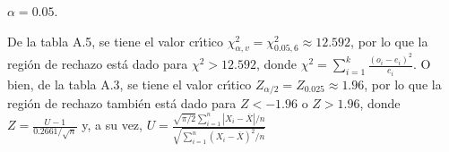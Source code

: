 \begin{solucion}
 \begin{significancia}
  $\alpha = 0.05$.
 \end{significancia}

 \begin{region}
  De la tabla A.5, se tiene el valor cr\'{\i}tico
  $\chi^2_{\alpha,v} = \chi^2_{0.05,6} \approx 12.592$,
  por lo que la regi\'on de rechazo est\'a dado
  para $\chi^2 > 12.592$, donde
  $\chi^2 = \sum_{i=1}^{k} \frac{\left( o_i - e_i \right)^2}{e_i}$.
  O bien, de la tabla A.3, se tiene el valor cr\'{\i}tico
  $Z_{\alpha/2} = Z_{0.025} \approx 1.96$,
  por lo que la regi\'on de rechazo tambi\'en est\'a dado
  para $Z < -1.96$ o $Z > 1.96$,
  donde $Z = \frac{U - 1}{0.2661/\sqrt{n}}$ y, a su vez,
  $U = \frac{\sqrt{\pi/2} \sum_{i=1}^{n} \left| X_i - \overline{X} \right|/n}{
  \sqrt{\sum_{i=1}^n \left( X_i - \overline{X} \right)^2/n}}$
 \end{region}


\end{solucion}
